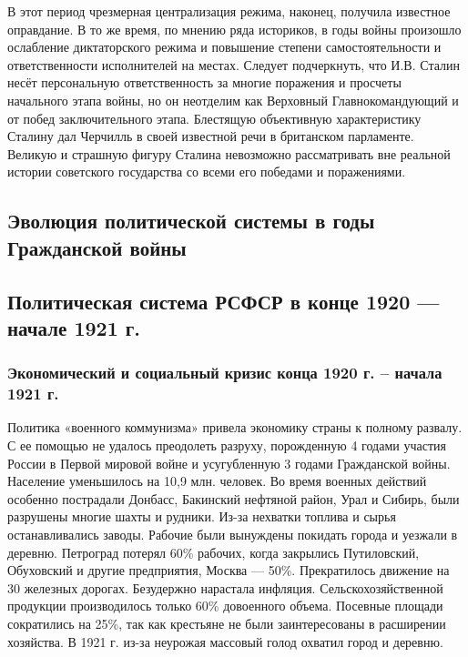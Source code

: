 \documentclass{article}
\begin{document}
\hfill

В этот период чрезмерная централизация режима, наконец, получила известное оправдание. В то же время, по мнению ряда историков, в годы войны произошло ослабление диктаторского режима и повышение степени самостоятельности и ответственности исполнителей на местах. Следует подчеркнуть, что И.В. Сталин несёт персональную ответственность за многие поражения и просчеты начального этапа войны, но он неотделим как Верховный Главнокомандующий и от побед заключительного этапа. Блестящую объективную характеристику Сталину дал Черчилль в своей известной речи в британском парламенте. Великую и страшную фигуру Сталина невозможно рассматривать вне реальной истории советского государства со всеми его победами и поражениями.

\subsection{Эволюция политической системы в годы Гражданской войны}

\hfill

\subsection{Политическая система РСФСР в конце 1920 — начале 1921 г.}

\subsubsection{Экономический и социальный кризис конца 1920 г. – начала 1921 г.}

Политика «военного коммунизма» привела экономику страны к полному развалу. С ее помощью не удалось преодолеть разруху, порожденную 4 годами участия России в Первой мировой войне и усугубленную 3 годами Гражданской войны. Население уменьшилось на 10,9 млн. человек. Во время военных действий особенно пострадали Донбасс, Бакинский нефтяной район, Урал и Сибирь, были разрушены многие шахты и рудники. Из-за нехватки топлива и сырья останавливались заводы. Рабочие были вынуждены покидать города и уезжали в деревню. Петроград потерял 60\% рабочих, когда закрылись Путиловский, Обуховский и другие предприятия, Москва — 50\%. Прекратилось движение на 30 железных дорогах. Безудержно нарастала инфляция. Сельскохозяйственной продукции производилось только 60\% довоенного объема. Посевные площади сократились на 25\%, так как крестьяне не были заинтересованы в расширении хозяйства. В 1921 г. из-за неурожая массовый голод охватил город и деревню.
\end{document}

